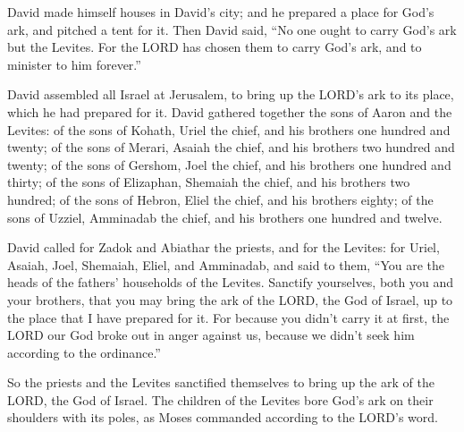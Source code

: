  David made himself houses in David's city; and he
prepared a place for God's ark, and pitched a tent for it.
 Then David said, ``No one ought to carry God's ark but
the Levites. For the LORD has chosen them to carry God's ark, and to
minister to him forever.''

 David assembled all Israel at Jerusalem, to bring up the
LORD's ark to its place, which he had prepared for it. 
David gathered together the sons of Aaron and the Levites:
 of the sons of Kohath, Uriel the chief, and his brothers
one hundred and twenty;  of the sons of Merari, Asaiah the
chief, and his brothers two hundred and twenty;  of the
sons of Gershom, Joel the chief, and his brothers one hundred and
thirty;  of the sons of Elizaphan, Shemaiah the chief, and
his brothers two hundred;  of the sons of Hebron, Eliel
the chief, and his brothers eighty;  of the sons of
Uzziel, Amminadab the chief, and his brothers one hundred and twelve.

 David called for Zadok and Abiathar the priests, and for
the Levites: for Uriel, Asaiah, Joel, Shemaiah, Eliel, and Amminadab,
 and said to them, ``You are the heads of the fathers'
households of the Levites. Sanctify yourselves, both you and your
brothers, that you may bring the ark of the LORD, the God of Israel, up
to the place that I have prepared for it.  For because
you didn't carry it at first, the LORD our God broke out in anger
against us, because we didn't seek him according to the ordinance.''

 So the priests and the Levites sanctified themselves to
bring up the ark of the LORD, the God of Israel.  The
children of the Levites bore God's ark on their shoulders with its
poles, as Moses commanded according to the LORD's word.

